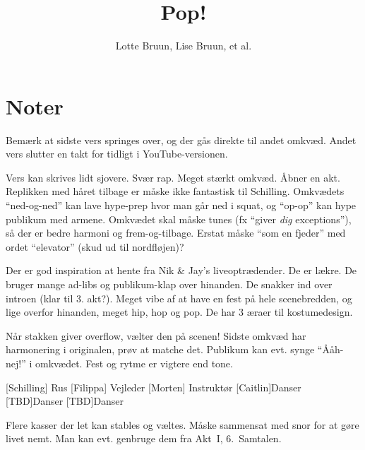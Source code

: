 \documentclass{article}
\title{Pop!}
\author{Lotte Bruun, Lise Bruun, et al.}
\begin{document}
                
\maketitle
\section*{Noter}
Bemærk at sidste vers springes over, og der gås direkte til andet omkvæd. Andet vers slutter en takt for tidligt i YouTube-versionen.

Vers kan skrives lidt sjovere. Svær rap. Meget stærkt omkvæd. Åbner en akt. Replikken med håret tilbage er måske ikke fantastisk til Schilling. Omkvædets ``ned-og-ned'' kan lave hype-prep hvor man går ned i squat, og ``op-op'' kan hype publikum med armene. Omkvædet skal måske tunes (fx ``giver \textit{dig} exceptions''), så der er bedre harmoni og frem-og-tilbage. Erstat måske ``som en fjeder'' med ordet ``elevator'' (skud ud til nordfløjen)?

Der er god inspiration at hente fra Nik \& Jay's liveoptrædender.  De er lækre.  De bruger mange ad-libs og publikum-klap over hinanden.  De snakker ind over introen (klar til 3. akt?).  Meget vibe af at have en fest på hele scenebredden, og lige overfor hinanden, meget hip, hop og pop.  De har 3 æraer til kostumedesign.


Når stakken giver overflow, vælter den på scenen!  Sidste omkvæd har harmonering i originalen, prøv at matche det.  Publikum kan evt. synge ``Ååh-nej!'' i omkvædet. Fest og rytme er vigtere end tone.

\begin{roles}
[Schilling] Rus
[Filippa] Vejleder
[Morten] Instruktør
[Caitlin]{Danser}
[TBD]{Danser}
[TBD]{Danser}
\end{roles}

\begin{props}
     Flere kasser der let kan stables og væltes. Måske sammensat med snor for at gøre livet nemt. Man kan evt. genbruge dem fra Akt~I, 6.~Samtalen.
\end{props}

\end{document}
